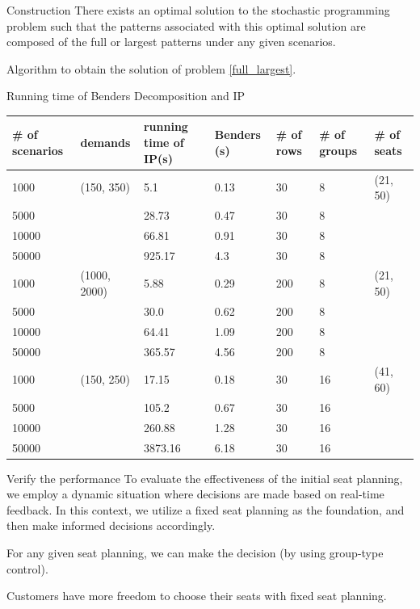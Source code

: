 \begin{frame}{Construction}
There exists an optimal solution to the stochastic programming problem such that the patterns associated with this optimal solution are composed of the full or largest patterns under any given scenarios.

Algorithm to obtain the solution of problem \eqref{full_largest}.
\end{frame}

\begin{frame}{Running time of Benders Decomposition and IP}
  \tiny
  \begin{table}[ht]
      \centering
      \begin{tabular}{|l|l|l|l|l|l|l|}
      \hline
      \# of scenarios & demands & running time of IP(s) & Benders (s) & \# of rows & \# of groups & \# of seats\\
      \hline
      1000  & (150, 350) & 5.1  & 0.13 & 30 & 8 & (21, 50)\\
      5000  & & 28.73 & 0.47 & 30 & 8 & \\
      10000 & & 66.81  & 0.91 & 30 & 8 & \\
      50000 & & 925.17 & 4.3 & 30 & 8 & \\
      \hline
      1000  & (1000, 2000) & 5.88 & 0.29 & 200 & 8 & (21, 50)\\
      5000  & & 30.0 & 0.62 & 200 & 8 & \\
      10000 & & 64.41 & 1.09 & 200 & 8 & \\
      50000 & & 365.57 & 4.56 & 200 & 8 & \\
      \hline
      1000  & (150, 250) & 17.15  & 0.18 & 30 & 16 & (41, 60) \\
      5000  & & 105.2  & 0.67 & 30 & 16 & \\
      10000 & & 260.88 & 1.28 & 30 & 16 & \\
      50000 & & 3873.16 & 6.18 & 30 & 16 & \\
      \hline
      \end{tabular}
    \end{table}
\end{frame}


\begin{frame}{Verify the performance}
  To evaluate the effectiveness of the initial seat planning, we employ a dynamic situation where decisions are made based on real-time feedback. In this context, we utilize a fixed seat planning as the foundation, and then make informed decisions accordingly.
  \vspace{0.5cm}
  
  For any given seat planning, we can make the decision (by using group-type control).
  \vspace{0.5cm}
  
  Customers have more freedom to choose their seats with fixed seat planning.
\end{frame}

